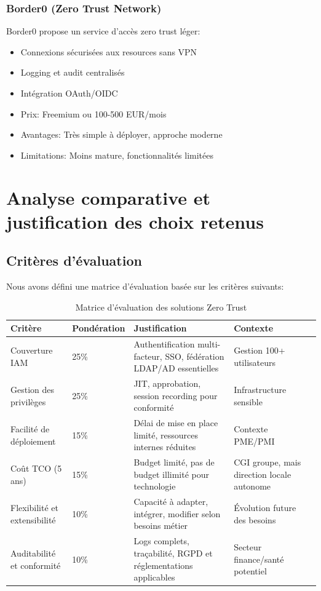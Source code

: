 \subsubsection{Border0 (Zero Trust Network)}

Border0 propose un service d'accès zero trust léger:
\begin{itemize}
    \item Connexions sécurisées aux resources sans VPN
    \item Logging et audit centralisés
    \item Intégration OAuth/OIDC
    \item Prix: Freemium ou 100-500 EUR/mois
    \item Avantages: Très simple à déployer, approche moderne
    \item Limitations: Moins mature, fonctionnalités limitées
\end{itemize}

\section{Analyse comparative et justification des choix retenus}

\subsection{Critères d'évaluation}

Nous avons défini une matrice d'évaluation basée sur les critères suivants:

\begin{table}[h]
\centering
\begin{tabularx}{\textwidth}{|l|X|X|X|X|}
\hline
\textbf{Critère} & \textbf{Pondération} & \textbf{Justification} & \textbf{Contexte} \\
\hline
Couverture IAM & 25\% & Authentification multi-facteur, SSO, fédération LDAP/AD essentielles & Gestion 100+ utilisateurs \\
\hline
Gestion des privilèges & 25\% & JIT, approbation, session recording pour conformité & Infrastructure sensible \\
\hline
Facilité de déploiement & 15\% & Délai de mise en place limité, ressources internes réduites & Contexte PME/PMI \\
\hline
Coût TCO (5 ans) & 15\% & Budget limité, pas de budget illimité pour technologie & CGI groupe, mais direction locale autonome \\
\hline
Flexibilité et extensibilité & 10\% & Capacité à adapter, intégrer, modifier selon besoins métier & Évolution future des besoins \\
\hline
Auditabilité et conformité & 10\% & Logs complets, traçabilité, RGPD et réglementations applicables & Secteur finance/santé potentiel \\
\hline
\end{tabularx}
\caption{Matrice d'évaluation des solutions Zero Trust}
\end{table}

